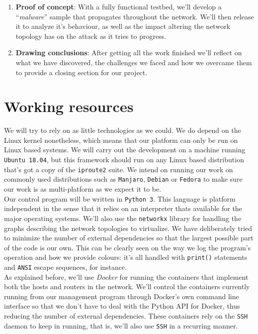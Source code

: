 \documentclass[12pt]{article}
\begin{document}
\begin{enumerate}
            \item \textbf{Proof of concept}: With a fully functional testbed, we'll develop a ``\textit{malware}'' sample that propagates throughout the network. We'll then release it to analyze it's behaviour, as well as the impact altering the network topology has on the attack as it tries to progress.

            \item \textbf{Drawing conclusions}: After getting all the work finished we'll reflect on what we have discovered, the challenges we faced and how we overcame them to provide a closing section for our project.
        \end{enumerate}

    \section{Working resources}
        We will try to rely on as little technologies as we could. We do depend on the Linux kernel nonetheless, which means that our platform can only be run on Linux based systems. We will carry out the development on a machine running \texttt{Ubuntu 18.04}, but this framework should run on any Linux based distribution that's got a copy of the \texttt{iproute2} suite. We intend on running our work on commonly used distributions such as \texttt{Manjaro}, \texttt{Debian} or \texttt{Fedora} to make sure our work is as multi-platform as we expect it to be.\\

        Our control program will be written in \texttt{Python 3}. This language is platform independent in the sense that it relies on an interpreter thats available for the major operating systems. We'll also use the \texttt{networkx} library for handling the graphs describing the network topologies to virtualize. We have deliberately tried to minimize the number of external dependencies so that the largest possible part of the code is our own. This can be clearly seen on the way we log the program's operation and how we provide colours: it's all handled with \texttt{print()} statements and \texttt{ANSI} escape sequences, for instance.\\

        As explained before, we'll use \textit{Docker} for running the containers that implement both the hosts and routers in the network. We'll control the containers currently running from our management program through Docker's own command line interface so that we don't have to deal with the Python API for Docker, thus reducing the number of external dependencies. These containers rely on the \texttt{SSH} daemon to keep in running, that is, we'll also use \texttt{SSH} in a recurring manner.\\
\end{document}
